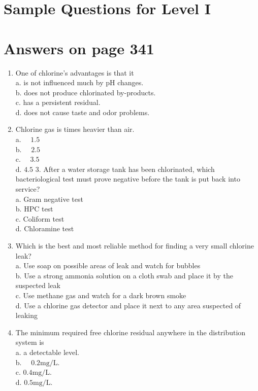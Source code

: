 \documentclass[10pt]{article}
\begin{document}
\section{Sample Questions for Level I}
\section{Answers on page 341}
\begin{enumerate}
  \item One of chlorine's advantages is that it\\
a. is not influenced much by $\mathrm{pH}$ changes.\\
b. does not produce chlorinated by-products.\\
c. has a persistent residual.\\
d. does not cause taste and odor problems.

  \item Chlorine gas is times heavier than air.\\
a. $\quad 1.5$\\
b. $\quad 2.5$\\
c. $\quad 3.5$\\
d. $4.5$ 3. After a water storage tank has been chlorinated, which bacteriological test must prove negative before the tank is put back into service?\\
a. Gram negative test\\
b. HPC test\\
c. Coliform test\\
d. Chloramine test

  \item Which is the best and most reliable method for finding a very small chlorine leak?\\
a. Use soap on possible areas of leak and watch for bubbles\\
b. Use a strong ammonia solution on a cloth swab and place it by the suspected leak\\
c. Use methane gas and watch for a dark brown smoke\\
d. Use a chlorine gas detector and place it next to any area suspected of leaking

  \item The minimum required free chlorine residual anywhere in the distribution system is\\
a. a detectable level.\\
b. $\quad 0.2 \mathrm{mg} / \mathrm{L}$.\\
c. $0.4 \mathrm{mg} / \mathrm{L}$.\\
d. $0.5 \mathrm{mg} / \mathrm{L}$.

\end{enumerate}
\end{document}
